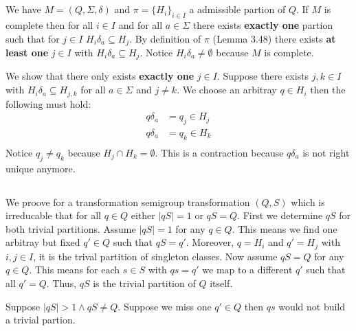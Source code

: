 \documentclass[a4paper,12pt,numbers=noenddot]{scrreport}
\begin{document}

\setcounter{chapter}{4}
\chapter{}
\section{}
We have $M = (Q, \Sigma, \delta)$ and $\pi = \{H_i\}_{i \in I}$ a admissible partion of $Q$.
If $M$ is complete then for all $i \in I$ and for all $a \in \Sigma$ there exists \textbf{exactly one} partion such that for $j \in I$ $H_i\delta_a \subseteq H_j$.
By definition of $\pi$ (Lemma 3.48) there exists \textbf{at least one} $j \in I$ with $H_i\delta_a \subseteq H_j$.
Notice $H_i\delta_a \neq \emptyset$ because $M$ is complete.

We show that there only exists \textbf{exactly one} $j \in I$.
Suppose there exists $j,k \in I$ with $H_i\delta_a \subseteq H_{j,k}$ for all $a \in \Sigma$ and $j \neq k$.
We choose an arbitray $q \in H_i$ then the following must hold:
\begin{align*}
    q\delta_a &= q_j \in H_j \\
    q\delta_a &= q_k \in H_k \\
\end{align*}
Notice $q_j \neq q_k$ because $H_j \cap H_k = \emptyset$.
This is a contraction because $q\delta_a$ is not right unique anymore.

\section{}
We proove for a transformation semigroup transformation $(Q,S)$ which is irreducable that for all $q \in Q$ either $|qS| = 1$  or $qS = Q$.
First we determine $qS$ for both trivial partitions.
Assume $|qS| = 1$ for any $q \in Q$. This means we find one arbitray but fixed $q' \in Q$ such that $qS = q'$.
Moreover, $q = H_i$ and $q' = H_j$ with $i,j \in I$, it is the trival partition of singleton classes.
Now assume $qS = Q$ for any $q \in Q$. This means for each $s \in S$ with $qs = q'$ we map to a different $q'$ such that all $q' = Q$.
Thus, $qS$ is the trivial partition of $Q$ itself.


Suppose $|qS| > 1 \land qS \neq Q$.
Suppose we miss one $q' \in Q$ then $qs$ would not build a trivial partion.

\end{document}
